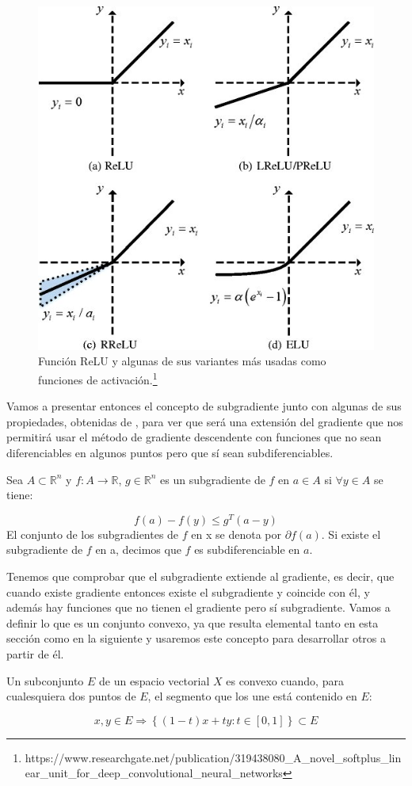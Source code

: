 \begin{figure}
    \centering
    \includegraphics[width=0.5\linewidth]{3ReLU&oth.jpg}
    \caption{Función ReLU y algunas de sus variantes más usadas como funciones de activación.\footnote{https://www.researchgate.net/publication/319438080\_A\_novel\_softplus\_linear\_unit\_for\_deep\_convolutional\_neural\_networks}}
    \label{fig:3.ReLU}
\end{figure}



Vamos a presentar entonces el concepto de subgradiente junto con algunas de sus propiedades, obtenidas de \cite{convexSubgrad}, para ver que será una extensión del gradiente que nos permitirá usar el método de gradiente descendente con funciones que no sean diferenciables en algunos puntos pero que sí sean subdiferenciables.

\begin{definicion}[Subgradiente]
     Sea $A \subset \mathbb{R}^n$ y $f:A \rightarrow \mathbb{R}$, $g \in \mathbb{R}^n$ es un subgradiente de $f$ en $a \in A$ si $\forall y \in A$ se tiene:

    $$f(a)-f(y) \leq g^T(a-y)$$
    El conjunto de los subgradientes de $f$ en x se denota por $\partial f(a)$. Si existe el subgradiente de $f$ en a, decimos que $f$ es subdiferenciable en $a$.
\end{definicion}

Tenemos que comprobar que el subgradiente extiende al gradiente, es decir, que cuando existe gradiente entonces existe el subgradiente y coincide con él, y además hay funciones que no tienen el gradiente pero sí subgradiente. Vamos a definir lo que es un conjunto convexo, ya que resulta elemental tanto en esta sección como en la siguiente y usaremos este concepto para desarrollar otros a partir de él.


\begin{definicion}
    Un subconjunto $E$ de un espacio vectorial $X$ es convexo cuando, para cualesquiera dos puntos de $E$, el segmento que los une está contenido en $E$:

    $$x,y \in E \Rightarrow \left \{ (1-t)x + ty : t\in [0,1] \right \} \subset E$$
\end{definicion}

